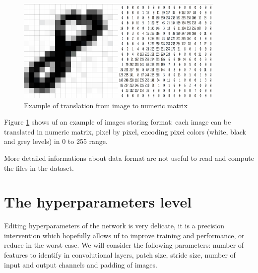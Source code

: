\begin{figure}
	\centering
	\includegraphics[width=0.9\textwidth]{Images/image_to_matrix}
	\caption{Example of translation from image to numeric matrix}
	\label{fig:image_to_matrix}
\end{figure}

Figure \ref{fig:image_to_matrix} shows uf an example of images storing format: each image can be translated in numeric matrix, pixel by pixel, encoding pixel colors (white, black and grey levels) in 0 to 255 range.

More detailed informations about data format are not useful to read and compute the files in the dataset.

\section{The hyperparameters level}

Editing hyperparameters of the network is very delicate, it is a precision intervention which hopefully allows uf to improve training and performance, or reduce in the worst case. We will consider the following parameters: number of features to identify in convolutional layers, patch size, stride size, number of input and output channels and padding of images.

